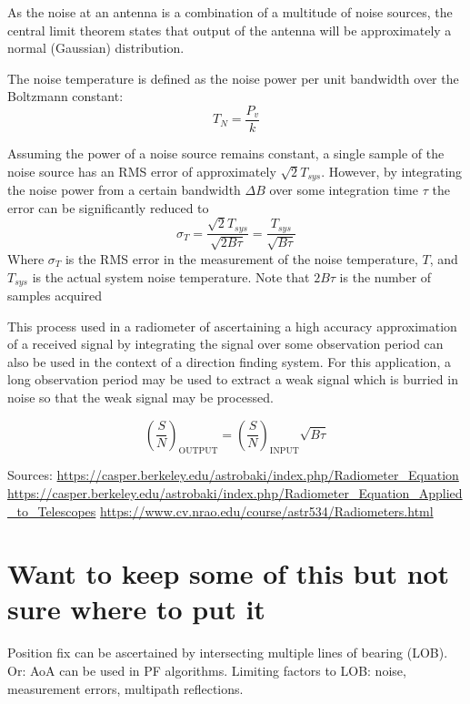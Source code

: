 As the noise at an antenna is a combination of a multitude of noise sources, the central limit theorem states that output of the antenna will be approximately a normal (Gaussian) distribution. 

The noise temperature is defined as the noise power per unit bandwidth over the Boltzmann constant:
\begin{equation}
  T_N = \frac{P_v}{k}
\end{equation}

Assuming the power of a noise source remains constant, a single sample of the noise source has an RMS error of approximately \(\sqrt{2}T_{sys}\). However, by integrating the noise power from a certain bandwidth \(\Delta B\) over some integration time \(\tau\) the error can be significantly reduced to
\begin{equation}
  \sigma_{T} = \frac{\sqrt{2}T_{sys}}{\sqrt{2B\tau}} = \frac{T_{sys}}{\sqrt{B \tau}}
\end{equation}
Where \(\sigma_{T}\) is the RMS error in the measurement of the noise temperature, \(T\), and \(T_{sys}\) is the actual system noise temperature. Note that \(2B\tau\) is the number of samples acquired

This process used in a radiometer of ascertaining a high accuracy approximation of a received signal by integrating the signal over some observation period can also be used in the context of a direction finding system. For this application, a long observation period may be used to extract a weak signal which is burried in noise so that the weak signal may be processed.

\begin{equation}
  \left( \frac{S}{N} \right)_{\text{OUTPUT}} = \left( \frac{S}{N} \right)_{\text{INPUT}}\sqrt{B\tau}
\end{equation}

Sources: \url{https://casper.berkeley.edu/astrobaki/index.php/Radiometer_Equation}
\url{https://casper.berkeley.edu/astrobaki/index.php/Radiometer_Equation_Applied_to_Telescopes}
\url{https://www.cv.nrao.edu/course/astr534/Radiometers.html}

\section{Want to keep some of this but not sure where to put it}
Position fix can be ascertained by intersecting multiple lines of bearing (LOB). Or: AoA can be used in PF algorithms. 
Limiting factors to LOB: noise, measurement errors, multipath reflections. 

